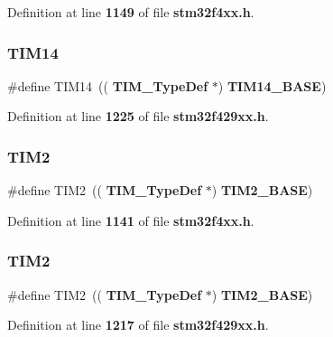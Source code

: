 Definition at line \textbf{ 1149} of file \textbf{ stm32f4xx.\+h}.

\mbox{\label{group__Peripheral__declaration_ga2dd30f46fad69dd73e1d8941a43daffe}} 
\subsubsection{T\+I\+M14\hspace{0.1cm}{\footnotesize\ttfamily [2/2]}}
{\footnotesize\ttfamily \#define T\+I\+M14~((\textbf{ T\+I\+M\+\_\+\+Type\+Def} $\ast$) \textbf{ T\+I\+M14\+\_\+\+B\+A\+SE})}



Definition at line \textbf{ 1225} of file \textbf{ stm32f429xx.\+h}.

\mbox{\label{group__Peripheral__declaration_ga3cfac9f2e43673f790f8668d48b4b92b}} 
\subsubsection{T\+I\+M2\hspace{0.1cm}{\footnotesize\ttfamily [1/2]}}
{\footnotesize\ttfamily \#define T\+I\+M2~((\textbf{ T\+I\+M\+\_\+\+Type\+Def} $\ast$) \textbf{ T\+I\+M2\+\_\+\+B\+A\+SE})}



Definition at line \textbf{ 1141} of file \textbf{ stm32f4xx.\+h}.

\mbox{\label{group__Peripheral__declaration_ga3cfac9f2e43673f790f8668d48b4b92b}} 
\subsubsection{T\+I\+M2\hspace{0.1cm}{\footnotesize\ttfamily [2/2]}}
{\footnotesize\ttfamily \#define T\+I\+M2~((\textbf{ T\+I\+M\+\_\+\+Type\+Def} $\ast$) \textbf{ T\+I\+M2\+\_\+\+B\+A\+SE})}



Definition at line \textbf{ 1217} of file \textbf{ stm32f429xx.\+h}.

